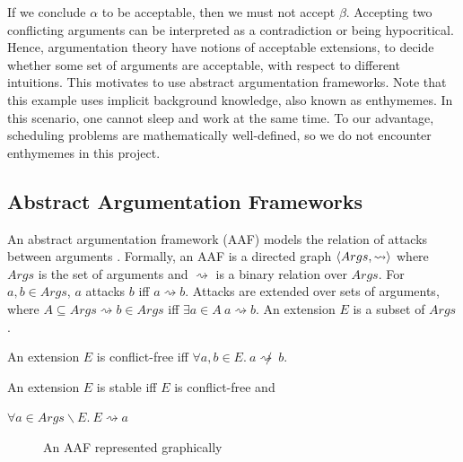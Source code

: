 \begin{center}
\end{center}

If we conclude $\alpha$ to be acceptable, then we must not accept $\beta$. Accepting two conflicting arguments can be interpreted as a contradiction or being hypocritical. Hence, argumentation theory have notions of acceptable extensions, to decide whether some set of arguments are acceptable, with respect to different intuitions. This motivates to use abstract argumentation frameworks.\linespace
Note that this example uses implicit background knowledge, also known as enthymemes. In this scenario, one cannot sleep and work at the same time. To our advantage, scheduling problems are mathematically well-defined, so we do not encounter enthymemes in this project.

\subsection{Abstract Argumentation Frameworks}
\label{aaf}

An abstract argumentation framework (AAF) models the relation of attacks between arguments \cite{aa}. Formally, an AAF is a directed graph $\langle{Args},{\rightsquigarrow}\rangle$ where $Args$ is the set of arguments and $\rightsquigarrow$ is a binary relation over $Args$. For $a,b\in Args$, $a$ attacks $b$ iff $a\rightsquigarrow b$. Attacks are extended over sets of arguments, where $A\subseteq Args\rightsquigarrow b\in Args$ iff $\exists a\in A\ a\rightsquigarrow b$. An extension $E$ is a subset of $Args$.

\begin{definition}
	An extension $E$ is conflict-free iff $\forall a,b\in E.\ a\not\rightsquigarrow\ b$.
\end{definition}

\begin{definition}
	An extension $E$ is stable iff $E$ is conflict-free and
	
	$\forall a\in Args\backslash E.\ E\rightsquigarrow a$
\end{definition}

\begin{figure}[H]
	\begin{center}
	\end{center}
	\caption{An AAF represented graphically}
\end{figure}

